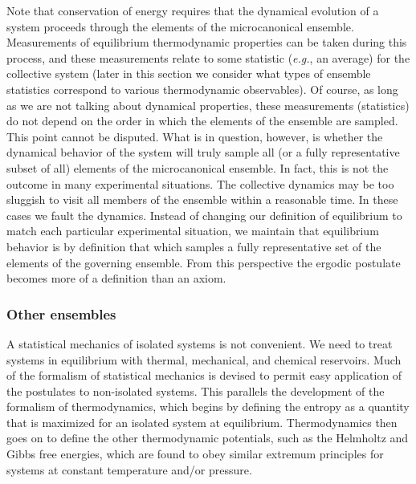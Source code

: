 \documentclass[]{article}
\begin{document}
Note that conservation of energy requires that the dynamical evolution
of a system proceeds through the elements of the microcanonical
ensemble. Measurements of equilibrium thermodynamic properties can be
taken during this process, and these measurements relate to some
statistic (\emph{e.g.}, an average) for the collective system (later in
this section we consider what types of ensemble statistics correspond to
various thermodynamic observables). Of course, as long as we are not
talking about dynamical properties, these measurements (statistics) do
not depend on the order in which the elements of the ensemble are
sampled. This point cannot be disputed. What is in question, however, is
whether the dynamical behavior of the system will truly sample all (or a
fully representative subset of all) elements of the microcanonical
ensemble. In fact, this is not the outcome in many experimental
situations. The collective dynamics may be too sluggish to visit all
members of the ensemble within a reasonable time. In these cases we
fault the dynamics. Instead of changing our definition of equilibrium to
match each particular experimental situation, we maintain that
equilibrium behavior is by definition that which samples a fully
representative set of the elements of the governing ensemble. From this
perspective the ergodic postulate becomes more of a definition than an
axiom.

\subsubsection{Other ensembles}\label{other-ensembles}

A statistical mechanics of isolated systems is not convenient. We need
to treat systems in equilibrium with thermal, mechanical, and chemical
reservoirs. Much of the formalism of statistical mechanics is devised to
permit easy application of the postulates to non-isolated systems. This
parallels the development of the formalism of thermodynamics, which
begins by defining the entropy as a quantity that is maximized for an
isolated system at equilibrium. Thermodynamics then goes on to define
the other thermodynamic potentials, such as the Helmholtz and Gibbs free
energies, which are found to obey similar extremum principles for
systems at constant temperature and/or pressure.
\end{document}
